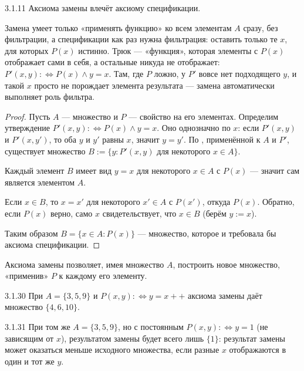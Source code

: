 \begin{exercise}{3.1.11}{}
Аксиома замены влечёт аксиому спецификации.
\end{exercise}

\begin{intuition}
Замена умеет только «применять функцию» ко всем элементам $A$ сразу, без фильтрации, а
спецификации как раз нужна фильтрация: оставить только те $x$, для которых $P(x)$ истинно.
Трюк — «функция», которая элементы с $P(x)$ отображает сами в себя, а остальные никуда не
отображает: $P'(x,y) :\iff P(x) \land y = x$. Там, где $P$ ложно, у $P'$ вовсе нет подходящего
$y$, и такой $x$ просто не порождает элемента результата — замена автоматически выполняет
роль фильтра.
\end{intuition}

\begin{proof}
Пусть $A$ — множество и $P$ — свойство на его элементах. Определим утверждение
$P'(x,y) :\iff P(x) \land y=x$. Оно однозначно по $x$: если $P'(x,y)$ и $P'(x,y')$, то оба
$y$ и $y'$ равны $x$, значит $y=y'$. По , применённой к $A$
и $P'$, существует множество $B := \{y : P'(x,y) \text{ для некоторого } x \in A\}$.

 Каждый элемент $B$ имеет вид $y=x$ для некоторого $x \in A$ с
$P(x)$ — значит сам является элементом $A$.

 Если $x \in B$, то $x=x'$ для некоторого
$x' \in A$ с $P(x')$, откуда $P(x)$. Обратно, если $P(x)$ верно, само $x$ свидетельствует,
что $x \in B$ (берём $y:=x$).

Таким образом $B = \{x \in A : P(x)\}$ — множество, которое и требовала бы аксиома
спецификации.
\end{proof}

\begin{remark}
Аксиома замены позволяет, имея множество $A$, построить новое множество, «применив»
$P$ к каждому его элементу.
\end{remark}

\begin{example}{3.1.30}{}
При $A=\{3,5,9\}$ и $P(x,y) :\iff y=x{+}{+}$ аксиома замены даёт множество $\{4,6,10\}$.
\end{example}

\begin{example}{3.1.31}{}
При том же $A=\{3,5,9\}$, но с постоянным $P(x,y) :\iff y=1$ (не зависящим от $x$),
результатом замены будет всего лишь $\{1\}$: результат замены может оказаться меньше
исходного множества, если разные $x$ отображаются в один и тот же $y$.
\end{example}

